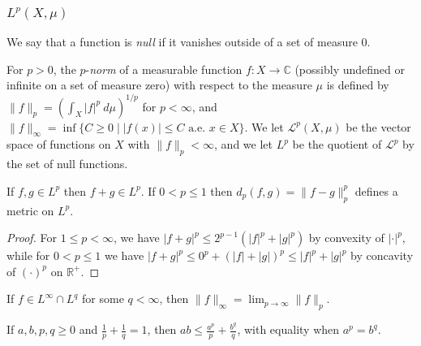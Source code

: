 

\subsubsection{$L^p(X,\mu)$}


\begin{defn} We say that a function is \emph{null} if it vanishes outside of a set of measure $0$.
\end{defn}

\begin{defn} For $p > 0$, the $p$-\emph{norm} of a measurable function $f : X \rightarrow \mathbb{C}$ (possibly undefined or infinite on a set of measure zero) with respect to the measure $\mu$ is defined by $\|f\|_p = (\int_X |f|^p\ d\mu)^{1/p}$ for $p < \infty$, and $\|f\|_\infty = \inf\{C \ge 0 \mid |f(x)| \le C\text{ a.e. }x \in X\}$. We let $\mathcal{L}^p(X,\mu)$ be the vector space of functions on $X$ with $\|f\|_p < \infty$, and we let $L^p$ be the quotient of $\mathcal{L}^p$ by the set of null functions.
\end{defn}

\begin{prop} If $f, g \in L^p$ then $f+g \in L^p$. If $0 < p \le 1$ then $d_p(f,g) = \|f-g\|_p^p$ defines a metric on $L^p$.
\end{prop}
\begin{proof} For $1 \le p < \infty$, we have $|f+g|^p \le 2^{p-1}(|f|^p + |g|^p)$ by convexity of $|\cdot |^p$, while for $0 < p \le 1$ we have $|f+g|^p \le 0^p + (|f|+|g|)^p \le |f|^p + |g|^p$ by concavity of $(\cdot )^p$ on $\mathbb{R}^+$.
\end{proof}

\begin{prop} If $f \in L^\infty \cap L^q$ for some $q < \infty$, then $\|f\|_\infty = \lim_{p \rightarrow \infty} \|f\|_p$.
\end{prop}

\begin{lem} If $a,b,p,q \ge 0$ and $\frac{1}{p} + \frac{1}{q} = 1$, then $ab \le \frac{a^p}{p} + \frac{b^q}{q}$, with equality when $a^p = b^q$.
\end{lem}

